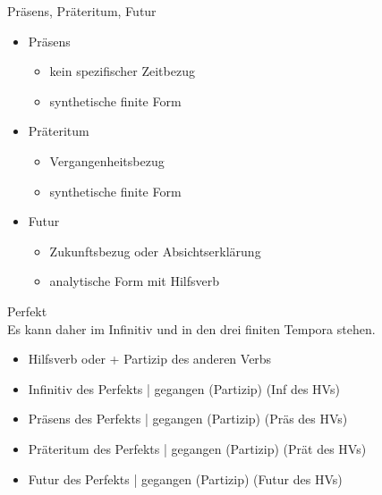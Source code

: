 \begin{frame}
  {Präsens, Präteritum, Futur}
  \onslide<+->
  \begin{itemize}[<+->]
    \item Präsens
      \begin{itemize}[<+->]
        \item kein spezifischer Zeitbezug
        \item synthetische finite Form
      \end{itemize}
      \Viertelzeile
    \item Präteritum
      \begin{itemize}[<+->]
        \item Vergangenheitsbezug
        \item synthetische finite Form
      \end{itemize}
     \Viertelzeile 
    \item Futur
      \begin{itemize}[<+->]
        \item Zukunftsbezug oder Absichtserklärung
        \item analytische Form mit  Hilfsverb
      \end{itemize}
  \end{itemize}
  \onslide<+->
  \Halbzeile
  \hspace{3em}
\end{frame}

\begin{frame}
  {Perfekt}
  \onslide<+->
  \onslide<+->
  \\
  \onslide<+->
  \Viertelzeile
  Es kann daher im Infinitiv und in den drei finiten Tempora stehen.\\
  \Zeile
  \begin{itemize}[<+->]
    \item Hilfsverb  oder  + \alert{Partizip} des anderen Verbs
      \Halbzeile
    \item Infinitiv des Perfekts | \alert{gegangen} (Partizip)  (Inf des HVs)
    \item Präsens des Perfekts | \alert{gegangen} (Partizip)  (Präs des HVs)
    \item Präteritum des Perfekts | \alert{gegangen} (Partizip)  (Prät des HVs)
    \item Futur des Perfekts | \alert{gegangen} (Partizip)  (Futur des HVs)
  \end{itemize}
\end{frame}


